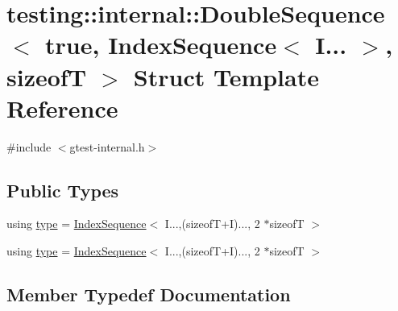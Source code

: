 \hypertarget{structtesting_1_1internal_1_1_double_sequence_3_01true_00_01_index_sequence_3_01_i_8_8_8_01_4_00_01sizeof_t_01_4}{}\section{testing\+::internal\+::Double\+Sequence$<$ true, Index\+Sequence$<$ I... $>$, sizeofT $>$ Struct Template Reference}
\label{structtesting_1_1internal_1_1_double_sequence_3_01true_00_01_index_sequence_3_01_i_8_8_8_01_4_00_01sizeof_t_01_4}


{\ttfamily \#include $<$gtest-\/internal.\+h$>$}

\subsection*{Public Types}
\begin{DoxyCompactItemize}
\item 
using \mbox{\hyperlink{structtesting_1_1internal_1_1_double_sequence_3_01true_00_01_index_sequence_3_01_i_8_8_8_01_4_00_01sizeof_t_01_4_a6f0fbcc14f5264c7db52f3ba3e264545}{type}} = \mbox{\hyperlink{structtesting_1_1internal_1_1_index_sequence}{Index\+Sequence}}$<$ I...,(sizeofT+I)..., 2 $\ast$sizeofT $>$
\item 
using \mbox{\hyperlink{structtesting_1_1internal_1_1_double_sequence_3_01true_00_01_index_sequence_3_01_i_8_8_8_01_4_00_01sizeof_t_01_4_a6f0fbcc14f5264c7db52f3ba3e264545}{type}} = \mbox{\hyperlink{structtesting_1_1internal_1_1_index_sequence}{Index\+Sequence}}$<$ I...,(sizeofT+I)..., 2 $\ast$sizeofT $>$
\end{DoxyCompactItemize}


\subsection{Member Typedef Documentation}
\mbox{\label{structtesting_1_1internal_1_1_double_sequence_3_01true_00_01_index_sequence_3_01_i_8_8_8_01_4_00_01sizeof_t_01_4_a6f0fbcc14f5264c7db52f3ba3e264545}} 
